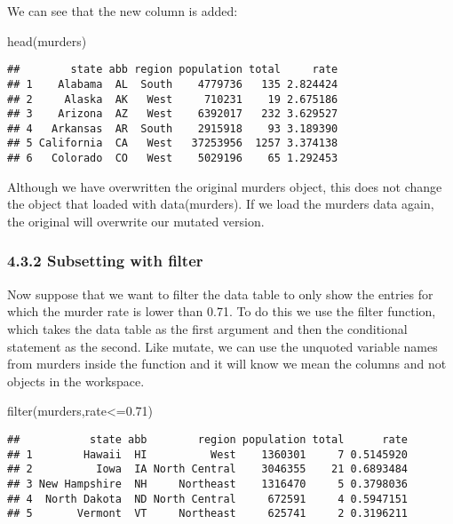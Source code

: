 \documentclass[
]{article}
\newenvironment{Shaded}{\begin{snugshade}}{\end{snugshade}}
\newcommand{\FloatTok}[1]{\textcolor[rgb]{0.00,0.00,0.81}{#1}}
\newcommand{\FunctionTok}[1]{\textcolor[rgb]{0.00,0.00,0.00}{#1}}
\newcommand{\NormalTok}[1]{#1}
\newcommand{\SpecialCharTok}[1]{\textcolor[rgb]{0.00,0.00,0.00}{#1}}
\begin{document}
We can see that the new column is added:

\begin{Shaded}
\begin{Highlighting}[]
\FunctionTok{head}\NormalTok{(murders)}
\end{Highlighting}
\end{Shaded}

\begin{verbatim}
##        state abb region population total     rate
## 1    Alabama  AL  South    4779736   135 2.824424
## 2     Alaska  AK   West     710231    19 2.675186
## 3    Arizona  AZ   West    6392017   232 3.629527
## 4   Arkansas  AR  South    2915918    93 3.189390
## 5 California  CA   West   37253956  1257 3.374138
## 6   Colorado  CO   West    5029196    65 1.292453
\end{verbatim}

Although we have overwritten the original murders object, this does not
change the object that loaded with data(murders). If we load the murders
data again, the original will overwrite our mutated version.

\hypertarget{subsetting-with-filter}{%
\subsubsection{4.3.2 Subsetting with
filter}\label{subsetting-with-filter}}

Now suppose that we want to filter the data table to only show the
entries for which the murder rate is lower than 0.71. To do this we use
the filter function, which takes the data table as the first argument
and then the conditional statement as the second. Like mutate, we can
use the unquoted variable names from murders inside the function and it
will know we mean the columns and not objects in the workspace.

\begin{Shaded}
\begin{Highlighting}[]
\FunctionTok{filter}\NormalTok{(murders,rate}\SpecialCharTok{\textless{}=}\FloatTok{0.71}\NormalTok{)}
\end{Highlighting}
\end{Shaded}

\begin{verbatim}
##           state abb        region population total      rate
## 1        Hawaii  HI          West    1360301     7 0.5145920
## 2          Iowa  IA North Central    3046355    21 0.6893484
## 3 New Hampshire  NH     Northeast    1316470     5 0.3798036
## 4  North Dakota  ND North Central     672591     4 0.5947151
## 5       Vermont  VT     Northeast     625741     2 0.3196211
\end{verbatim}
\end{document}
